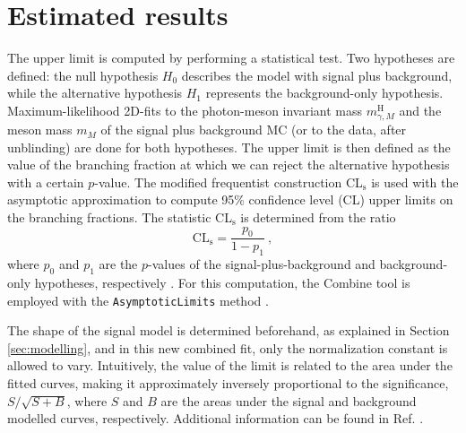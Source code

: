 \section{Estimated results}\label{sec:results}

The upper limit is computed by performing a statistical test. Two hypotheses are defined: the null hypothesis $H_0$ describes the model with signal plus background, while the alternative hypothesis $H_1$ represents the background-only hypothesis. Maximum-likelihood 2D-fits to the photon-meson invariant mass $m^{\text{H}}_{\gamma, M}$ and the meson mass $m_{M}$ of the signal plus background MC (or to the data, after unblinding) are done for both hypotheses. The upper limit is then defined as the value of the branching fraction at which we can reject the alternative hypothesis with a certain $p$-value. The modified frequentist construction CL$_\text{s}$ \cite{Read:2002hq, Junk:1999kv} is used with the asymptotic approximation \cite{Cowan:2010js} to compute 95\% confidence level (CL) upper limits on the branching fractions. The statistic CL$_\text{s}$ is determined from the ratio
\begin{equation*}
    \text{CL}_{\text{s}} = \frac{p_0}{1-p_1}\ ,
\end{equation*}
where $p_0$ and $p_1$ are the $p$-values of the signal-plus-background and background-only hypotheses, respectively \cite{PDG}. For this computation, the Combine tool is employed with the \verb+AsymptoticLimits+ method \cite{CMS:Combine}.

The shape of the signal model is determined beforehand, as explained in Section \ref{sec:modelling}, and in this new combined fit, only the normalization constant is allowed to vary. Intuitively, the value of the limit is related to the area under the fitted curves, making it approximately inversely proportional to the significance, $S/\sqrt{S+B}$, where $S$ and $B$ are the areas under the signal and background modelled curves, respectively. Additional information can be found in Ref. \cite{Cowan:2010js}.

